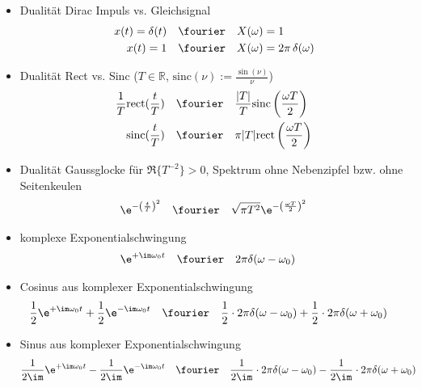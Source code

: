 \begin{itemize}
\item Dualität Dirac Impuls vs. Gleichsignal
\begin{align}
x(t)=\delta(t) &\quad \fourier \quad X(\omega)=1\\
x(t)=1 &\quad \fourier \quad X(\omega)=2\pi\,\delta(\omega)
\end{align}

\item Dualität Rect vs. Sinc ($T\in\mathbb{R}$, $\mathrm{sinc}(\nu) := \frac{\sin(\nu)}{\nu}$)
\begin{align}
\frac{1}{T} \mathrm{rect}(\frac{t}{T}) &\quad \fourier \quad \frac{|T|}{T} \mathrm{sinc}\left(\frac{\omega T}{2}\right)\\
\mathrm{sinc}(\frac{t}{T}) &\quad \fourier \quad \pi |T| \mathrm{rect}\left(\frac{\omega T}{2}\right)
\end{align}

\item Dualität Gaussglocke für $\Re\{T^{-2}\}>0$, Spektrum ohne Nebenzipfel bzw. ohne Seitenkeulen
\begin{align}
\e^{-\left(\frac{t}{T}\right)^2} \quad \fourier \quad \sqrt{\pi T^2} \e^{-\left(\frac{\omega T}{2}\right)^2}
\end{align}


\item komplexe Exponentialschwingung
\begin{align}
\e^{+\im\omega_0 t} &\quad \fourier \quad 2\pi\delta(\omega - \omega_0)
\end{align}

\item Cosinus aus komplexer Exponentialschwingung
\begin{align}
\frac{1}{2} \e^{+\im\omega_0 t} + \frac{1}{2}  \e^{-\im\omega_0 t} &\quad \fourier \quad \frac{1}{2} \cdot 2\pi\delta(\omega -\omega_0) +\frac{1}{2} \cdot 2\pi\delta(\omega + \omega_0)
\end{align}

\item Sinus aus komplexer Exponentialschwingung
\begin{align}
\frac{1}{2\im} \e^{+\im\omega_0 t} - \frac{1}{2\im}  \e^{-\im\omega_0 t} &\quad \fourier \quad \frac{1}{2\im} \cdot 2\pi\delta(\omega -\omega_0) - \frac{1}{2\im} \cdot 2\pi\delta(\omega + \omega_0)
\end{align}
\end{itemize}



